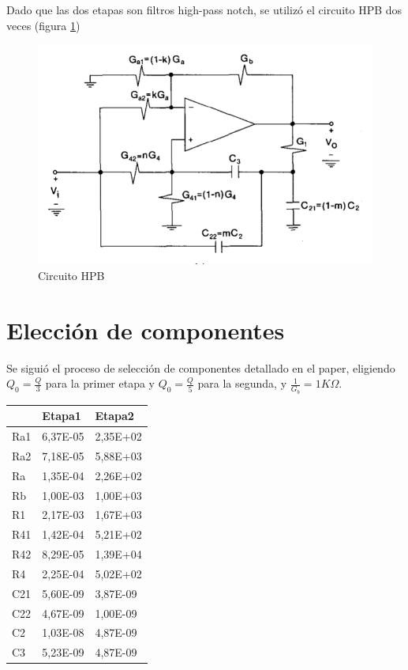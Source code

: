 \documentclass[../../tc_tp5_main.tex]{subfiles}
\begin{document}
Dado que las dos etapas son filtros high-pass notch, se utiliz\'o el circuito HPB dos veces (figura \ref{HPB})

\begin{figure}[H]
\centering
\includegraphics[scale=1]{imagenes/HPB.png}
\caption{Circuito HPB}
\label{HPB}
\end{figure}

\section{Elecci\'on de componentes}

Se sigui\'o el proceso de selecci\'on de componentes detallado en el paper, eligiendo  $Q_0 = \frac{Q}{3}$ para la primer etapa y $Q_0 = \frac{Q}{5}$ para la segunda, y $\frac{1}{G_b} = 1K\Omega$.


\begin{table}[H]
\centering
\begin{tabular}{l|ll}
\hline
    & Etapa1   & Etapa2   \\
    \hline
Ra1 & 6,37E-05 & 2,35E+02 \\
Ra2 & 7,18E-05 & 5,88E+03 \\
Ra  & 1,35E-04 & 2,26E+02 \\
Rb  & 1,00E-03 & 1,00E+03 \\
R1  & 2,17E-03 & 1,67E+03 \\
R41 & 1,42E-04 & 5,21E+02 \\
R42 & 8,29E-05 & 1,39E+04 \\
R4  & 2,25E-04 & 5,02E+02 \\
C21 & 5,60E-09 & 3,87E-09 \\
C22 & 4,67E-09 & 1,00E-09 \\
C2  & 1,03E-08 & 4,87E-09 \\
C3  & 5,23E-09 & 4,87E-09 \\
\hline
\end{tabular}
\end{table}
\end{document}

